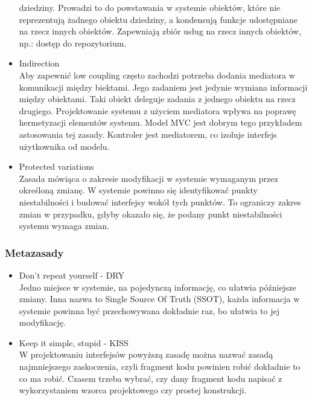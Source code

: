 \documentclass[a4paper]{article}
\begin{document}
\begin{itemize}
        dziedziny. Prowadzi to do powstawania w
        systemie obiektów, które nie reprezentują
        żadnego obiektu dziedziny, a kondensują
        funkcje udostępniane na rzecz innych
        obiektów.
        Zapewniają zbiór usług na rzecz innych
        obiektów, np.: dostęp do repozytorium.
        \item Indirection\\
        Aby zapewnić low coupling często zachodzi potrzeba
        dodania mediatora w komunikacji między biektami.
        Jego zadaniem jest jedynie wymiana informacji
        między obiektami. Taki obiekt deleguje zadania z
        jednego obiektu na rzecz drugiego. Projektowanie
        systemu z użyciem mediatora wpływa na poprawę
        hermetyzacji elementów systemu.
        Model MVC jest dobrym tego przykładem astosowania
        tej zasady. Kontroler jest mediatorem, co izoluje
        interfejs użytkownika od modelu.
        \item Protected variations\\
        Zasada mówiąca o zakresie modyfikacji w systemie
        wymaganym przez określoną zmianę. W systemie
        powinno się identyfikować punkty niestabilności i
        budować interfejsy wokół tych punktów.
        To ograniczy zakres zmian w przypadku, gdyby
        okazało się, że podany punkt niestabilności systemu
        wymaga zmian.
    \end{itemize}




    \subsubsection{Metazasady}


    \begin{itemize}
        \item Don't repeat yourself - DRY\\
        Jedno miejsce w systemie, na pojedynczą informację,
        co ułatwia późniejsze zmiany.
        Inna nazwa to Single Source Of Truth (SSOT), każda
        informacja w systemie powinna być przechowywana
        dokładnie raz, bo ułatwia to jej modyfikację.
        \item Keep it simple, stupid - KISS\\
        W projektowaniu interfejsów powyższą zasadę można
        nazwać zasadą najmniejszego zaskoczenia, czyli
        fragment kodu powinien robić dokładnie to co ma
        robić.
        Czasem trzeba wybrać, czy dany fragment kodu
        napisać z wykorzystaniem wzorca projektowego czy
        prostej konstrukcji.
    \end{itemize}
\end{document}
